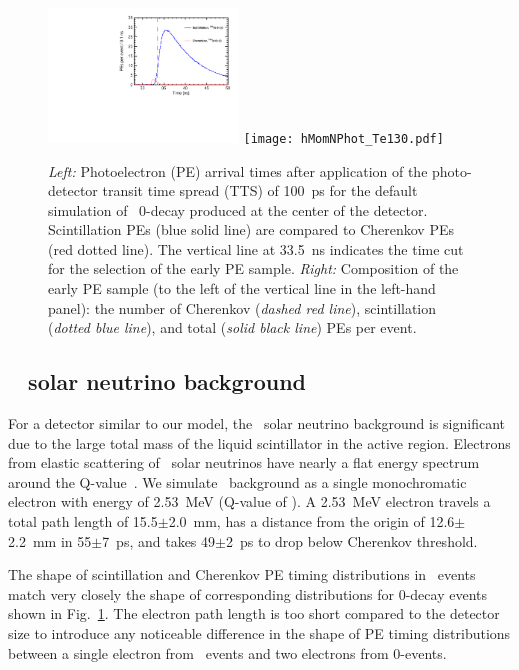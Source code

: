 \begin{figure}[ht]
  \centering
  \includegraphics[width=0.45\textwidth]{hT_Te130_v2.pdf}
\hfil
  \texttt{[image: hMomNPhot\_Te130.pdf]}
  \caption{\emph{Left:} Photoelectron (PE) arrival times after
    application of the photo-detector transit time spread (TTS) of
    100~ps for the default simulation of \Te~0\nbb-decay produced at
    the center of the detector.  Scintillation PEs (blue solid line)
    are compared to Cherenkov PEs (red dotted line). The vertical line
    at 33.5~ns indicates the time cut for the selection of the early
    PE sample.  \emph{Right:} Composition of the early PE sample (to
    the left of the vertical line in the left-hand panel):
    the number of Cherenkov (\emph{dashed red line}), scintillation
    (\emph{dotted blue line}), and total (\emph{solid black line}) PEs
    per event.}
\label{fig:ArrivalTimeDist}
\end{figure}


\subsection{\B~ solar neutrino background}

For a detector similar to our model, the \B~solar neutrino background is
significant due to the large total mass of the liquid scintillator in the
active region.  Electrons from elastic scattering of \B~solar
neutrinos have nearly a flat energy spectrum around the
Q-value~\cite{SNOp-B8-bkg}. We simulate \B~background as a single
monochromatic electron with energy of 2.53~MeV (Q-value of \Te). A
2.53~MeV electron travels a total path length of 15.5$\pm$2.0~mm, has
a distance from the origin of 12.6$\pm$2.2~mm in 55$\pm$7~ps, and
takes 49$\pm$2~ps to drop below Cherenkov threshold.

The shape of scintillation and Cherenkov PE timing distributions in
\B~events match very closely the shape of corresponding distributions
for 0\nbb-decay events shown in Fig.~\ref{fig:ArrivalTimeDist}. The
electron path length is too short compared to the detector size to
introduce any noticeable difference in the shape of PE timing
distributions between a single electron from \B~events and two
electrons from 0\nbb-events. 

